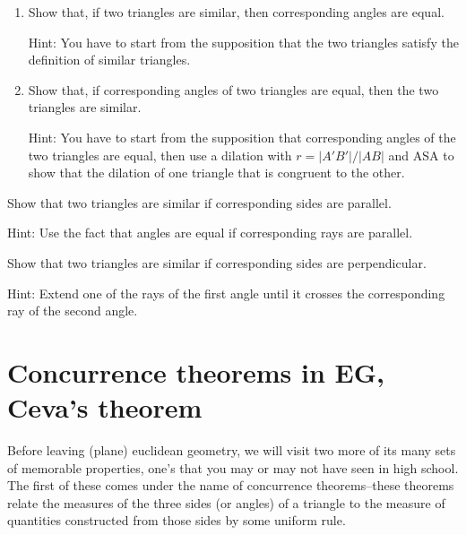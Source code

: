 \documentclass{ximera}
\begin{document}
\begin{question}
\begin{enumerate}
\item Show that, if two triangles are similar, then corresponding
angles are equal.

Hint: You have to start from the supposition that the two triangles satisfy
the definition of similar triangles.

\item Show that, if corresponding angles of two triangles are equal, then the two
triangles are similar.

Hint: You have to start from the supposition that corresponding angles of the
two triangles are equal, then use a dilation with $r=|A'B'|/|AB|$ and ASA to show that the dilation of one triangle that is congruent
to the other.
\end{enumerate}
\end{question}

\begin{question}
\label{39} Show that two triangles are similar if corresponding
sides are parallel.

Hint: Use the fact that angles are equal if corresponding rays are
parallel.
\end{question}

\begin{question}
Show that two triangles are similar if corresponding sides are perpendicular.

Hint: Extend one of the rays of the first angle until it crosses the
corresponding ray of the second angle.
\end{question}


\section*{Concurrence theorems in \textbf{EG}, Ceva's theorem}

Before leaving (plane) euclidean geometry, we will visit two more of
its many sets of memorable properties, one's that you may or may not
have seen in high school. The first of these comes under the name of
concurrence theorems--these theorems relate the measures of the three
sides (or angles) of a triangle to the measure of quantities
constructed from those sides by some uniform rule.
\end{document}
